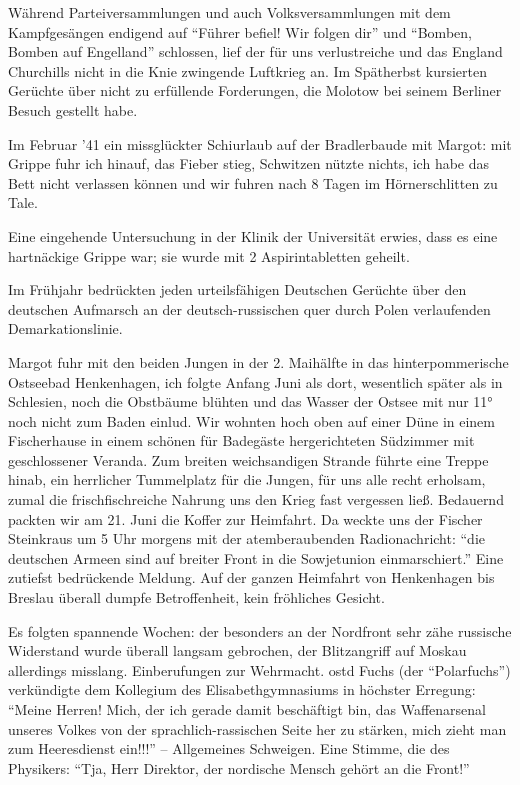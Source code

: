 Während Parteiversammlungen und auch Volksversammlungen mit dem Kampfgesängen endigend auf \enquote{Führer befiel! Wir folgen dir} und \enquote{Bomben, Bomben auf Engelland} schlossen,  lief der für uns verlustreiche und das England Churchills nicht in die Knie zwingende Luftkrieg an.  Im Spätherbst kursierten Gerüchte über nicht zu erfüllende Forderungen, die Molotow bei seinem Berliner Besuch gestellt habe.

Im Februar '41 ein missglückter Schiurlaub auf der Bradlerbaude mit Margot: mit Grippe fuhr ich hinauf, das Fieber stieg, Schwitzen nützte nichts, ich habe das Bett nicht verlassen können und wir fuhren nach 8 Tagen im Hörnerschlitten zu Tale.

Eine eingehende Untersuchung in der Klinik der Universität erwies, dass es eine hartnäckige Grippe war; sie wurde mit 2 Aspirintabletten geheilt.

Im Frühjahr bedrückten jeden urteilsfähigen Deutschen Gerüchte über den deutschen Aufmarsch an der deutsch-russischen quer durch Polen verlaufenden Demarkationslinie.

Margot fuhr mit den beiden Jungen in der 2. Maihälfte in das hinterpommerische Ostseebad Henkenhagen, ich folgte Anfang Juni als dort, wesentlich später als in Schlesien, noch die Obstbäume blühten und das Wasser der Ostsee mit nur 11° noch nicht zum Baden einlud. Wir wohnten hoch oben auf einer Düne in einem Fischerhause in einem schönen für Badegäste hergerichteten Südzimmer mit geschlossener Veranda. Zum breiten weichsandigen Strande führte eine Treppe hinab, ein herrlicher Tummelplatz für die Jungen, für uns alle recht erholsam, zumal die frischfischreiche Nahrung uns den Krieg fast vergessen ließ. Bedauernd packten wir am 21. Juni die Koffer zur Heimfahrt. Da weckte uns der Fischer Steinkraus um 5 Uhr morgens mit der atemberaubenden Radionachricht: \enquote{die deutschen Armeen sind auf breiter Front in die Sowjetunion einmarschiert.} Eine zutiefst bedrückende Meldung. Auf der  ganzen Heimfahrt von Henkenhagen bis Breslau überall dumpfe Betroffenheit, kein fröhliches Gesicht.

Es folgten spannende Wochen: der besonders an der Nordfront sehr zähe russische Widerstand wurde überall langsam gebrochen, der Blitzangriff auf Moskau allerdings misslang. Einberufungen zur Wehrmacht. \ac{ostd} Fuchs (der \enquote{Polarfuchs}) verkündigte dem Kollegium des Elisabethgymnasiums in höchster Erregung: \enquote{Meine Herren! Mich, der ich gerade damit beschäftigt bin, das Waffenarsenal unseres Volkes von der sprachlich-rassischen Seite her zu stärken, mich zieht man zum Heeresdienst ein!!!} -- Allgemeines Schweigen. Eine Stimme, die des Physikers: \enquote{Tja, Herr Direktor, der nordische Mensch gehört an die Front!}

